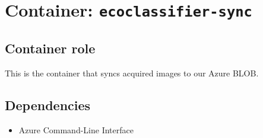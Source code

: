 \section{Container: \texttt{ecoclassifier-sync}}

\subsection{Container role}

This is the container that syncs acquired images to our Azure BLOB.

\subsection{Dependencies}

\begin{itemize}
    \item Azure Command-Line Interface
\end{itemize}
